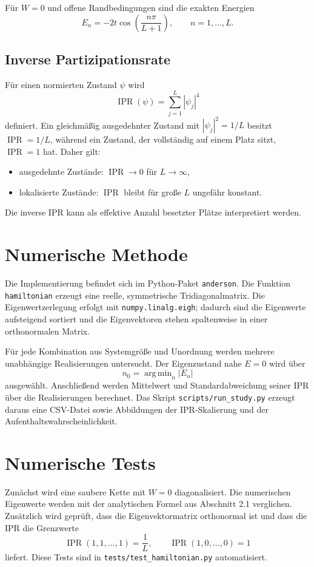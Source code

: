 \documentclass[11pt,a4paper]{article}
\begin{document}
Für $W=0$ und offene Randbedingungen sind die exakten Energien
\begin{equation}
 E_n=-2t\cos\left(\frac{n\pi}{L+1}\right),
 \qquad n=1,\ldots,L.
\end{equation}

\subsection{Inverse Partizipationsrate}
Für einen normierten Zustand $\psi$ wird
\begin{equation}
 \operatorname{IPR}(\psi)=\sum_{j=1}^{L}|\psi_j|^4
\end{equation}
definiert. Ein gleichmäßig ausgedehnter Zustand mit
$|\psi_j|^2=1/L$ besitzt $\operatorname{IPR}=1/L$, während ein Zustand,
der vollständig auf einem Platz sitzt, $\operatorname{IPR}=1$ hat. Daher
gilt:
\begin{itemize}
  \item ausgedehnte Zustände: $\operatorname{IPR}\to 0$ für $L\to\infty$,
  \item lokalisierte Zustände: $\operatorname{IPR}$ bleibt für große $L$
  ungefähr konstant.
\end{itemize}
Die inverse IPR kann als effektive Anzahl besetzter Plätze interpretiert
werden.

\section{Numerische Methode}
Die Implementierung befindet sich im Python-Paket \texttt{anderson}. Die
Funktion \texttt{hamiltonian} erzeugt eine reelle, symmetrische
Tridiagonalmatrix. Die Eigenwertzerlegung erfolgt mit
\texttt{numpy.linalg.eigh}; dadurch sind die Eigenwerte aufsteigend sortiert
und die Eigenvektoren stehen spaltenweise in einer orthonormalen Matrix.

Für jede Kombination aus Systemgröße und Unordnung werden mehrere unabhängige
Realisierungen untersucht. Der Eigenzustand nahe $E=0$ wird über
\begin{equation}
 n_0=\mathop{\mathrm{arg\,min}}_n |E_n|
\end{equation}
ausgewählt. Anschließend werden Mittelwert und Standardabweichung seiner IPR
über die Realisierungen berechnet. Das Skript
\texttt{scripts/run\_study.py} erzeugt daraus eine CSV-Datei sowie
Abbildungen der IPR-Skalierung und der Aufenthaltswahrscheinlichkeit.

\section{Numerische Tests}
Zunächst wird eine saubere Kette mit $W=0$ diagonalisiert. Die numerischen
Eigenwerte werden mit der analytischen Formel aus Abschnitt 2.1 verglichen.
Zusätzlich wird geprüft, dass die Eigenvektormatrix orthonormal ist und dass
die IPR die Grenzwerte
\begin{equation}
 \operatorname{IPR}(1,1,\ldots,1)=\frac{1}{L},
 \qquad
 \operatorname{IPR}(1,0,\ldots,0)=1
\end{equation}
liefert. Diese Tests sind in \texttt{tests/test\_hamiltonian.py} automatisiert.
\end{document}
